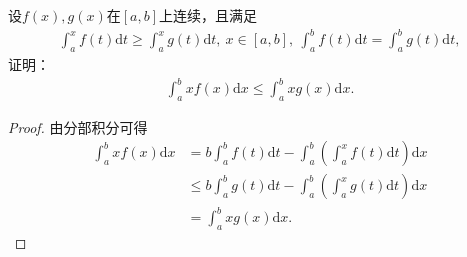 \documentclass[../../main.tex]{subfiles}
\begin{document}
\begin{example}
设$f(x),g(x)$在$[a,b]$上连续，且满足
\begin{align*}
\int_a^x f(t)\mathrm{d}t \geqslant \int_a^x g(t)\mathrm{d}t, \ x\in[a,b], \ \int_a^b f(t)\mathrm{d}t = \int_a^b g(t)\mathrm{d}t,
\end{align*}
证明：
\begin{align*}
\int_a^b xf(x)\mathrm{d}x \leqslant \int_a^b xg(x)\mathrm{d}x.
\end{align*}
\end{example}
\begin{proof}
由分部积分可得
\begin{align*}
\int_a^b{xf\left( x \right) \mathrm{d}x}&=b\int_a^b{f\left( t \right) \mathrm{d}t}-\int_a^b{\left( \int_a^x{f\left( t \right) \mathrm{d}t} \right) \mathrm{d}x}
\\
&\leqslant b\int_a^b{g\left( t \right) \mathrm{d}t}-\int_a^b{\left( \int_a^x{g\left( t \right) \mathrm{d}t} \right) \mathrm{d}x}
\\
&=\int_a^b{xg\left( x \right) \mathrm{d}x}.
\end{align*}

\end{proof}
\end{document}
